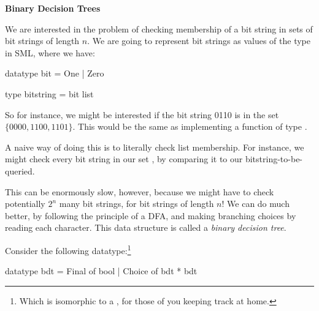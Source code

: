 

\textbf{Binary Decision Trees}

We are interested in the problem of checking membership of a bit string in sets
of bit strings of length $n$. We are going to represent bit strings as values of
the type  in SML, where we have:

\begin{codeblock}
  datatype bit = One | Zero

  type bitstring = bit list
\end{codeblock}

So for instance, we might be interested if the bit string 0110 is in the set $\{
0000, 1100, 1101 \}$. This would be the same as implementing a function of type
.

A naive way of doing this is to literally check list membership. For instance,
we might check every bit string in our set
, by comparing it to our bitstring-to-be-queried.

This can be enormously slow, however, because we might have to check potentially
$2^n$ many bit strings, for bit strings of length $n$! We can do much
better, by following the principle of a DFA, and making branching choices
by reading each character. This data structure is called a \textit{binary decision tree}.

Consider the following datatype:\footnote{Which is isomorphic to a , for
those of you keeping track at home.}
\begin{codeblock}
  datatype bdt =
      Final of bool
    | Choice of bdt * bdt
\end{codeblock}

